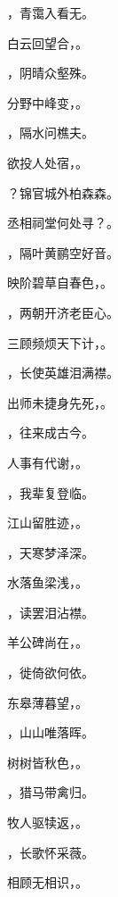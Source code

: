 \documentclass[12pt, a4paper, addpoints, answers]{exam}
\begin{document}
\begin{questions}
\question[3] ，青霭入看无。

\question[3] 白云回望合，。

\question[3] ，阴晴众壑殊。

\question[3] 分野中峰变，。

\question[3] ，隔水问樵夫。

\question[3] 欲投人处宿，。

\question[3] ？锦官城外柏森森。

\question[3] 丞相祠堂何处寻？。

\question[3] ，隔叶黄鹂空好音。

\question[3] 映阶碧草自春色，。

\question[3] ，两朝开济老臣心。

\question[3] 三顾频烦天下计，。

\question[3] ，长使英雄泪满襟。

\question[3] 出师未捷身先死，。

\question[3] ，往来成古今。

\question[3] 人事有代谢，。

\question[3] ，我辈复登临。

\question[3] 江山留胜迹，。

\question[3] ，天寒梦泽深。

\question[3] 水落鱼梁浅，。

\question[3] ，读罢泪沾襟。

\question[3] 羊公碑尚在，。

\question[3] ，徙倚欲何依。

\question[3] 东皋薄暮望，。

\question[3] ，山山唯落晖。

\question[3] 树树皆秋色，。

\question[3] ，猎马带禽归。

\question[3] 牧人驱犊返，。

\question[3] ，长歌怀采薇。

\question[3] 相顾无相识，。


\end{questions}
\end{document}
